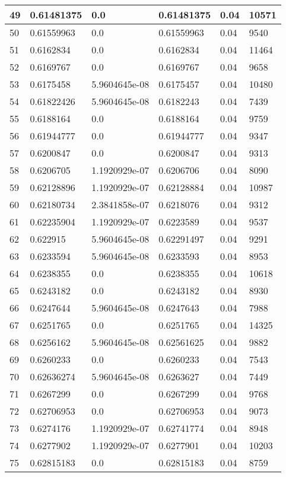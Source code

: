\begin{longtable}{|l|l|l|l|l|l|}
49 & 0.61481375 & 0.0 & 0.61481375 & 0.04 & 10571 \\ \hline 
50 & 0.61559963 & 0.0 & 0.61559963 & 0.04 & 9540 \\ \hline 
51 & 0.6162834 & 0.0 & 0.6162834 & 0.04 & 11464 \\ \hline 
52 & 0.6169767 & 0.0 & 0.6169767 & 0.04 & 9658 \\ \hline 
53 & 0.6175458 & 5.9604645e-08 & 0.6175457 & 0.04 & 10480 \\ \hline 
54 & 0.61822426 & 5.9604645e-08 & 0.6182243 & 0.04 & 7439 \\ \hline 
55 & 0.6188164 & 0.0 & 0.6188164 & 0.04 & 9759 \\ \hline 
56 & 0.61944777 & 0.0 & 0.61944777 & 0.04 & 9347 \\ \hline 
57 & 0.6200847 & 0.0 & 0.6200847 & 0.04 & 9313 \\ \hline 
58 & 0.6206705 & 1.1920929e-07 & 0.6206706 & 0.04 & 8090 \\ \hline 
59 & 0.62128896 & 1.1920929e-07 & 0.62128884 & 0.04 & 10987 \\ \hline 
60 & 0.62180734 & 2.3841858e-07 & 0.6218076 & 0.04 & 9312 \\ \hline 
61 & 0.62235904 & 1.1920929e-07 & 0.6223589 & 0.04 & 9537 \\ \hline 
62 & 0.622915 & 5.9604645e-08 & 0.62291497 & 0.04 & 9291 \\ \hline 
63 & 0.6233594 & 5.9604645e-08 & 0.6233593 & 0.04 & 8953 \\ \hline 
64 & 0.6238355 & 0.0 & 0.6238355 & 0.04 & 10618 \\ \hline 
65 & 0.6243182 & 0.0 & 0.6243182 & 0.04 & 8930 \\ \hline 
66 & 0.6247644 & 5.9604645e-08 & 0.6247643 & 0.04 & 7988 \\ \hline 
67 & 0.6251765 & 0.0 & 0.6251765 & 0.04 & 14325 \\ \hline 
68 & 0.6256162 & 5.9604645e-08 & 0.62561625 & 0.04 & 9882 \\ \hline 
69 & 0.6260233 & 0.0 & 0.6260233 & 0.04 & 7543 \\ \hline 
70 & 0.62636274 & 5.9604645e-08 & 0.6263627 & 0.04 & 7449 \\ \hline 
71 & 0.6267299 & 0.0 & 0.6267299 & 0.04 & 9768 \\ \hline 
72 & 0.62706953 & 0.0 & 0.62706953 & 0.04 & 9073 \\ \hline 
73 & 0.6274176 & 1.1920929e-07 & 0.62741774 & 0.04 & 8948 \\ \hline 
74 & 0.6277902 & 1.1920929e-07 & 0.6277901 & 0.04 & 10203 \\ \hline 
75 & 0.62815183 & 0.0 & 0.62815183 & 0.04 & 8759 \\ \hline 
\end{longtable}